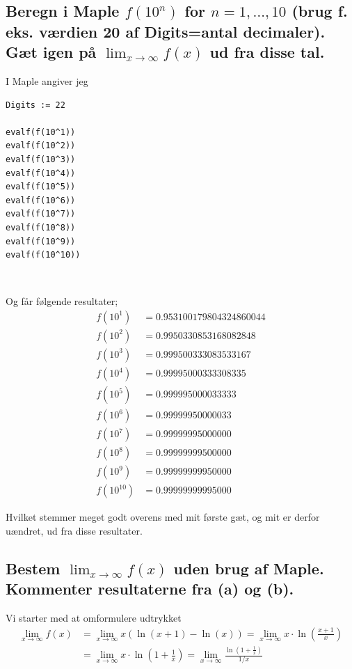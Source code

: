 \documentclass[11pt,a4paper]{article}
\newcommand{\limit}[2]{\lim_{#1 \rightarrow #2}}
\begin{document}
\subsection
{
    \mdseries
    Beregn i Maple $f(10^n)$ for $n = 1, \dots, 10$ (brug f. eks. værdien 20
    af Digits=antal decimaler). Gæt igen på $\limit{x}{\infty} f(x)$ ud fra
    disse tal.
}
\begin{multicols}{2}
    
    I Maple angiver jeg
\begin{lstlisting}
Digits := 22

evalf(f(10^1))
evalf(f(10^2))
evalf(f(10^3))
evalf(f(10^4))
evalf(f(10^5))
evalf(f(10^6))
evalf(f(10^7))
evalf(f(10^8))
evalf(f(10^9))
evalf(f(10^10))
\end{lstlisting}

    \vfill{\ }\columnbreak

    Og får følgende resultater;
    \begin{align}
        f(10^1)     &= 0.953100179804324860044 \\
        f(10^2)     &= 0.9950330853168082848 \\
        f(10^3)     &= 0.999500333083533167 \\
        f(10^4)     &= 0.99995000333308335 \\
        f(10^5)     &= 0.999995000033333 \\
        f(10^6)     &= 0.99999950000033 \\
        f(10^7)     &= 0.99999995000000 \\
        f(10^8)     &= 0.99999999500000 \\
        f(10^9)     &= 0.99999999950000 \\
        f(10^{10})  &= 0.99999999995000
    \end{align}

\end{multicols}

Hvilket stemmer meget godt overens med mit første gæt, og mit er derfor
uændret, ud fra disse resultater.

\subsection
{
    \mdseries
    Bestem $\limit{x}{\infty} f(x)$ uden brug af Maple. Kommenter resultaterne
    fra (a) og (b).
}
Vi starter med at omformulere udtrykket
\begin{align}
    \limit{x}{\infty} f(x)
    &= \limit{x}{\infty} x \left( \ln(x + 1) - \ln(x) \right)
     = \limit{x}{\infty} x \cdot \ln \left( \frac{x + 1}{x} \right) \\
    &= \limit{x}{\infty} x \cdot \ln \left( 1 + \frac{1}{x} \right)
     = \limit{x}{\infty} \frac{ \ln \left( 1 + \frac{1}{x} \right) }{1 / x}
\end{align}
\end{document}
